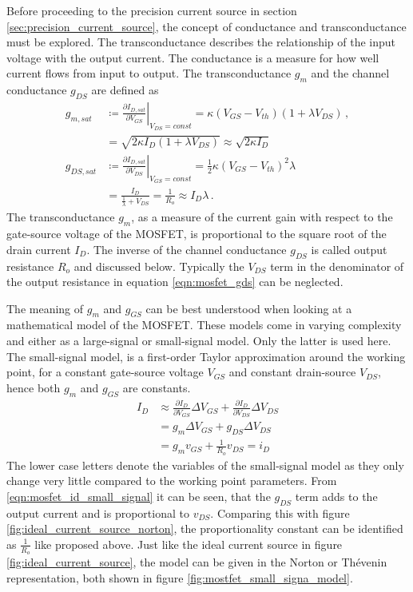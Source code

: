 Before proceeding to the precision current source in section \ref{sec:precision_current_source}, the concept of conductance and transconductance must be explored. The transconductance describes the relationship of the input voltage with the output current. The conductance is a measure for how well current flows from input to output. The transconductance $g_m$ and the channel conductance $g_{DS}$ are defined as
\begin{align}
    g_{m, sat} &\coloneqq \left. \frac{\partial I_{D,sat}}{\partial V_{GS}} \right|_{V_{DS} = const} = \kappa \left(V_{GS} - V_{th} \right) (1 + \lambda V_{DS}) \, , \label{eqn:mosfet_gm}\\
    &= \sqrt{2 \kappa I_D \left(1+ \lambda V_{DS}\right)} \approx \sqrt{2 \kappa I_D} \label{eqn:mosfet_gm_approximation} \\
    g_{DS, sat} &\coloneqq \left. \frac{\partial I_{D,sat}}{\partial V_{DS}} \right|_{V_{GS} = const} = \frac{1}{2} \kappa \left(V_{GS} - V_{th} \right)^2 \lambda\\
    &= \frac{I_D}{\frac{1}{\lambda} + V_{DS}} = \frac{1}{R_o} \approx I_D \lambda \label{eqn:mosfet_gds}\,.
\end{align}
The transconductance $g_m$, as a measure of the current gain with respect to the gate-source voltage of the MOSFET, is proportional to the square root of the drain current $I_D$. The inverse of the channel conductance $g_{DS}$ is called output resistance $R_o$ and discussed below. Typically the $V_{DS}$ term in the denominator of the output resistance in equation \ref{eqn:mosfet_gds} can be neglected.

The meaning of $g_{m}$ and $g_{GS}$ can be best understood when looking at a mathematical model of the MOSFET. These models come in varying complexity and either as a large-signal or small-signal model. Only the latter is used here. The small-signal model, is a first-order Taylor approximation around the working point, for a constant gate-source voltage $V_{GS}$ and constant drain-source $V_{DS}$, hence both $g_{m}$ and $g_{GS}$ are constants.
\begin{align}
    I_D &\approx \frac{\partial I_D}{\partial V_{GS}} \Delta V_{GS} + \frac{\partial I_D}{\partial V_{DS}} \Delta V_{DS}\\
    &= g_{m} \Delta V_{GS} + g_{DS} \Delta V_{DS}\\
    &= g_{m} v_{GS} + \frac{1}{R_o} v_{DS} = i_D \label{eqn:mosfet_id_small_signal}
\end{align}
The lower case letters denote the variables of the small-signal model as they only change very little compared to the working point parameters.
From \ref{eqn:mosfet_id_small_signal} it can be seen, that the $g_{DS}$ term adds to the output current and is proportional to $v_{DS}$. Comparing this with figure \ref{fig:ideal_current_source_norton}, the proportionality constant can be identified as $\frac{1}{R_o}$ like proposed above. Just like the ideal current source in figure \ref{fig:ideal_current_source}, the model can be given in the Norton or Thévenin representation, both shown in figure \ref{fig:mostfet_small_signa_model}.

